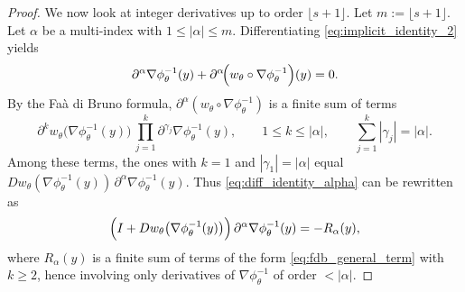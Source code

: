\documentclass[10pt,a4paper]{amsart}
\begin{document}
\begin{proof}
We now look at integer derivatives up to order $\lfloor s+1\rfloor$.
Let
$
m := \lfloor s+1\rfloor.
$
Let $\alpha$ be a multi-index with $1\le |\alpha| \le m$. Differentiating \eqref{eq:implicit_identity_2} yields
\begin{equation}
\label{eq:diff_identity_alpha}
\partial^\alpha \nabla\phi_\theta^{-1}(y) + \partial^\alpha\!\Bigl(w_\theta\circ\nabla\phi_\theta^{-1}\Bigr)(y) = 0.
\end{equation}
By the Fa\`a di Bruno formula, $\partial^\alpha(w_\theta\circ\nabla\phi_\theta^{-1})$ is a finite sum of terms
\begin{equation}
\label{eq:fdb_general_term}
\partial^k w_\theta\bigl(\nabla\phi_\theta^{-1}(y)\bigr)\,
\prod_{j=1}^k \partial^{\gamma_j}\nabla\phi_\theta^{-1}(y),
\qquad
1\le k\le|\alpha|,
\qquad
\sum_{j=1}^k |\gamma_j| = |\alpha|.
\end{equation}
Among these terms, the ones with $k=1$ and $|\gamma_1|=|\alpha|$ equal
$Dw_\theta(\nabla\phi_\theta^{-1}(y))\,\partial^\alpha \nabla\phi_\theta^{-1}(y)$.
Thus \eqref{eq:diff_identity_alpha} can be rewritten as
\begin{equation}
\label{eq:solve_alpha}
\Bigl(I + Dw_\theta\bigl(\nabla\phi_\theta^{-1}(y)\bigr)\Bigr)\,\partial^\alpha \nabla\phi_\theta^{-1}(y)
=
- R_\alpha(y),
\end{equation}
where $R_\alpha(y)$ is a finite sum of terms of the form \eqref{eq:fdb_general_term} with $k\ge 2$, hence involving only
derivatives of $\nabla\phi_\theta^{-1}$ of order $<|\alpha|$.


\end{proof}
\end{document}

